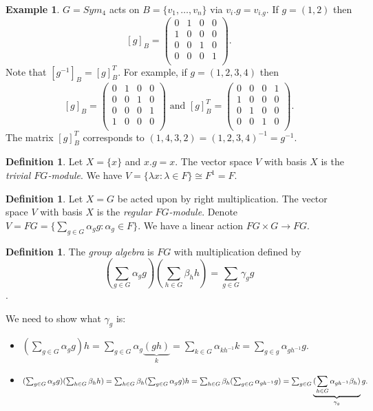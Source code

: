 \documentclass[12pt]{amsart}
\theoremstyle{definition}
\newtheorem{example}[theorem]{Example}
\newtheorem{definition}[theorem]{Definition}
\begin{document}
\begin{example}
$G=Sym_4$ acts on $B=\{v_1,\ldots,v_n\}$ via $v_i.g=v_{i.g}$.  If $g=(1,2)$ then
$$[g]_B=\left(\begin{array}{cccc}
0 & 1 & 0 & 0 \\
1 & 0 & 0 & 0 \\
0 & 0 & 1 & 0 \\
0 & 0 & 0 & 1 \\
\end{array}\right).$$
Note that $[g^{-1}]_B=[g]_B^T$.  For example, if $g=(1,2,3,4)$ then
$$[g]_B=\left(\begin{array}{cccc}
0 & 1 & 0 & 0 \\
0 & 0 & 1 & 0 \\
0 & 0 & 0 & 1 \\
1 & 0 & 0 & 0 \\
\end{array}\right)\textrm{ and }
[g]_B^T=\left(\begin{array}{cccc}
0 & 0 & 0 & 1 \\
1 & 0 & 0 & 0 \\
0 & 1 & 0 & 0 \\
0 & 0 & 1 & 0 \\
\end{array}\right).$$
The matrix $[g]_B^T$ corresponds to $(1,4,3,2)=(1,2,3,4)^{-1}=g^{-1}$.
\end{example}

\begin{definition}
Let $X=\{x\}$ and $x.g=x$.  The vector space $V$ with basis $X$ is the \emph{trivial $FG$-module}.  We have $V=\{\lambda x:\lambda\in F\}\cong F^1=F$.
\end{definition}

\begin{definition}
Let $X=G$ be acted upon by right multiplication.  The vector space $V$ with basis $X$ is the \emph{regular $FG$-module}.  Denote $V=FG=\{\sum_{g\in G}\alpha_g g:\alpha_g\in F\}$.  We have a linear action $FG\times G\rightarrow FG$.
\end{definition}

\begin{definition}  The \emph{group algebra} is $FG$ with multiplication defined by
$$\left(\sum_{g\in G}\alpha_g g\right)\left(\sum_{h\in G}\beta_h h\right)=\sum_{g\in G}\gamma_g g$$.
\end{definition}

We need to show what $\gamma_g$ is:
\begin{itemize}
\item $(\sum_{g\in G}\alpha_g g)h=\sum_{g\in G}\alpha_g\underbrace{(gh)}_k=\sum_{k\in G}\alpha_{kh^{-1}}k=\sum_{g\in g}\alpha_{gh^{-1}} g$.
\item $(\sum_{g\in G}\alpha_g g)(\sum_{h\in G}\beta_h h) = \sum_{h\in G}\beta_h (\sum_{g\in G}\alpha_g g)h \\
= \sum_{h\in G}\beta_h (\sum_{g\in G} \alpha_{gh^{-1}} g) = \sum_{g\in G} \underbrace{(\sum_{h\in G} \alpha_{gh^{-1}}\beta_h)}_{\gamma_g} g.$
\end{itemize}
\end{document}
